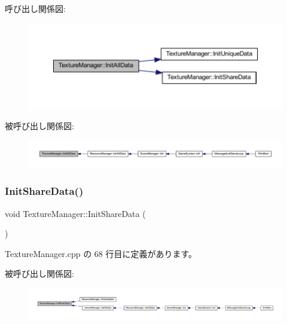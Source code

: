 呼び出し関係図\+:\nopagebreak
\begin{figure}[H]
\begin{center}
\leavevmode
\includegraphics[width=350pt]{class_texture_manager_aee4c784f3f32bfe810bf66313735dece_cgraph}
\end{center}
\end{figure}
被呼び出し関係図\+:
\nopagebreak
\begin{figure}[H]
\begin{center}
\leavevmode
\includegraphics[width=350pt]{class_texture_manager_aee4c784f3f32bfe810bf66313735dece_icgraph}
\end{center}
\end{figure}
\mbox{\label{class_texture_manager_aed1e9666d0ef8698db754280a1d4bad4}} 
\subsubsection{\texorpdfstring{Init\+Share\+Data()}{InitShareData()}}
{\footnotesize\ttfamily void Texture\+Manager\+::\+Init\+Share\+Data (\begin{DoxyParamCaption}{ }\end{DoxyParamCaption})\hspace{0.3cm}{\ttfamily [static]}}



 Texture\+Manager.\+cpp の 68 行目に定義があります。

被呼び出し関係図\+:
\nopagebreak
\begin{figure}[H]
\begin{center}
\leavevmode
\includegraphics[width=350pt]{class_texture_manager_aed1e9666d0ef8698db754280a1d4bad4_icgraph}
\end{center}
\end{figure}
\mbox{\label{class_texture_manager_abfba2c4293e692a351d9b98e28f6ed31}} 

